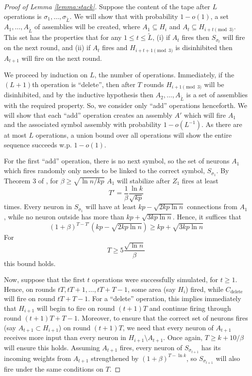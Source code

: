 \documentclass[12pt,nosubfloats]{alt2024} %
\newcommand{\1}{\mathbbm{1}}
\begin{document}
\begin{proof}[Proof of Lemma \ref{lemma:stack}]
Suppose the content of the tape after $L$ operations is $\sigma_1, \ldots, \sigma_{\tilde L}$. We will show that with probability $1 - o(1)$, a set $A_1, \ldots, A_{\tilde L}$ of assemblies will be created, where $A_1 \subseteq H_i$ and $A_{t} \subseteq H_{i + t \pmod 3}$. This set has the properties that for any $1 \le t \le \tilde L$, (i) if $A_t$ fires then $S_{\sigma_t}$ will fire on the next round, and (ii) if $A_t$ fires and $H_{i+t+1 \pmod 3}$ is disinhibited then $A_{t+1}$ will fire on the next round. 

We proceed by induction on $L$, the number of operations. Immediately, if the $(L+1)$th operation is ``delete'', then after $T$ rounds $H_{i+1 \pmod 3}$ will be disinhibited, and by the inductive hypothesis then $A_{2}, \ldots, A_{\tilde L}$ is a set of assemblies with the required property. So, we consider only ``add'' operations henceforth. We will show that each ``add'' operation creates an assembly $A'$ which will fire $A_1$ and the associated symbol assembly with probability $1 - o(L^{-1})$. As there are at most $L$ operations, a union bound over all operations will show the entire sequence succeeds w.p. $1 - o(1)$.

For the first ``add'' operation, there is no next symbol, so the set of neurons $A_1$ which fires randomly only needs to be linked to the correct symbol, $S_{\sigma_1}$. By Theorem 3 of \citet{papadimitriou2019random}, for $\beta \ge \sqrt{\ln n / kp}$ $A_1$ will stabilize after $Z_1$ fires at least
\[T' = \frac{1}{\beta} \frac{\ln k}{\sqrt{kp}}\]
times. Every neuron in $S_{\sigma_1}$ will have at least $kp - \sqrt{2kp \ln n}$ connections from $A_1$, while no neuron outside has more than $kp + \sqrt{3kp\ln n}$. Hence, it suffices that
\[(1 + \beta)^{T - T'} \left(kp - \sqrt{2kp \ln n}\right) \ge kp + \sqrt{3kp \ln n}\]
For
\[T \ge 5\frac{\sqrt{\ln n}}{\beta}\]
this bound holds. 

Now, suppose that the first $t$ operations were successfully simulated, for $t \ge 1$. Hence, on rounds $tT, tT+1, \ldots, tT + T - 1$, some area (say $H_i$) fired, while $C_{\text{delete}}$ will fire on round $tT + T- 1$. For a ``delete'' operation, this implies immediately that $H_{i+1}$ will begin to fire on round $(t+1)T$ and continue firing through round $(t+1)T + T - 1$. Moreover, to ensure that the correct set of neurons fires (say $A_{t+1} \subset H_{i+1}$) on round $(t+1)T$, we need that every neuron of $A_{t+1}$ receives more input than every neuron in $H_{i+1} \setminus A_{t+1}$. Once again, $T \ge k + 10/\beta$ will ensure this holds. Assuming $A_{t+1}$ fires, every neuron of $S_{\sigma_{t+1}}$ has its incoming weights from $A_{t+1}$ strengthened by $(1 + \beta)^{T - \ln k}$, so $S_{\sigma_{t+1}}$ will also fire under the same conditions on $T$.


\end{proof}
\end{document}
